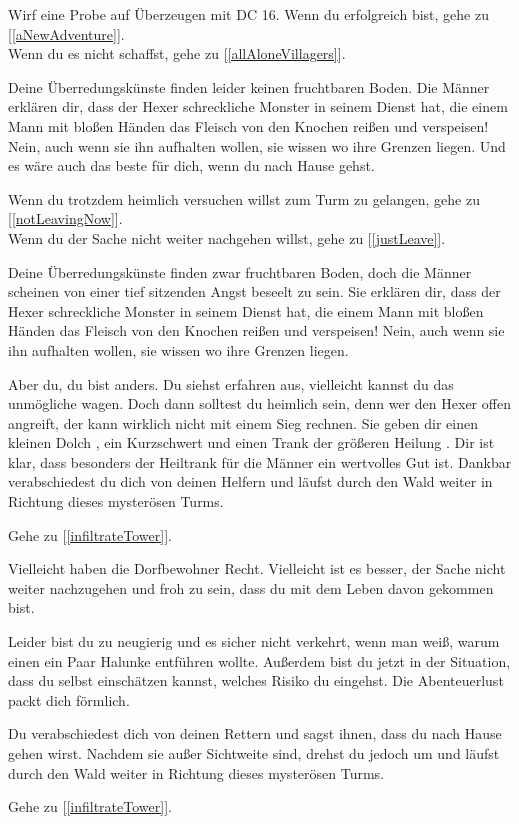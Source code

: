 Wirf eine Probe auf Überzeugen mit DC 16. Wenn du erfolgreich bist, gehe zu [\ref{aNewAdventure}].
\\Wenn du es nicht schaffst, gehe zu [\ref{allAloneVillagers}].


Deine Überredungskünste finden leider keinen fruchtbaren Boden. Die Männer erklären dir, dass der Hexer schreckliche Monster in seinem Dienst hat, die einem Mann mit bloßen Händen das Fleisch von den Knochen reißen und verspeisen! Nein, auch wenn sie ihn aufhalten wollen, sie wissen wo ihre Grenzen liegen. Und es wäre auch das beste für dich, wenn du nach Hause gehst.

Wenn du trotzdem heimlich versuchen willst zum Turm zu gelangen, gehe zu [\ref{notLeavingNow}].
\\Wenn du der Sache nicht weiter nachgehen willst, gehe zu [\ref{justLeave}].


Deine Überredungskünste finden zwar fruchtbaren Boden, doch die Männer scheinen von einer tief sitzenden Angst beseelt zu sein. Sie erklären dir, dass der Hexer schreckliche Monster in seinem Dienst hat, die einem Mann mit bloßen Händen das Fleisch von den Knochen reißen und verspeisen! Nein, auch wenn sie ihn aufhalten wollen, sie wissen wo ihre Grenzen liegen.

Aber du, du bist anders. Du siehst erfahren aus, vielleicht kannst du das unmögliche wagen. Doch dann solltest du heimlich sein, denn wer den Hexer offen angreift, der kann wirklich nicht mit einem Sieg rechnen. Sie geben dir einen kleinen Dolch , ein Kurzschwert  und einen Trank der größeren Heilung . Dir ist klar, dass besonders der Heiltrank für die Männer ein wertvolles Gut ist. Dankbar verabschiedest du dich von deinen Helfern und läufst durch den Wald weiter in Richtung dieses mysterösen Turms.

Gehe zu [\ref{infiltrateTower}].


Vielleicht haben die Dorfbewohner Recht. Vielleicht ist es besser, der Sache nicht weiter nachzugehen und froh zu sein, dass du mit dem Leben davon gekommen bist.

Leider bist du zu neugierig und es sicher nicht verkehrt, wenn man weiß, warum einen ein Paar Halunke entführen wollte. Außerdem bist du jetzt in der Situation, dass du selbst einschätzen kannst, welches Risiko du eingehst. Die Abenteuerlust packt dich förmlich.

Du verabschiedest dich von deinen Rettern und sagst ihnen, dass du nach Hause gehen wirst. Nachdem sie außer Sichtweite sind, drehst du jedoch um und läufst durch den Wald weiter in Richtung dieses mysterösen Turms.

Gehe zu [\ref{infiltrateTower}].
